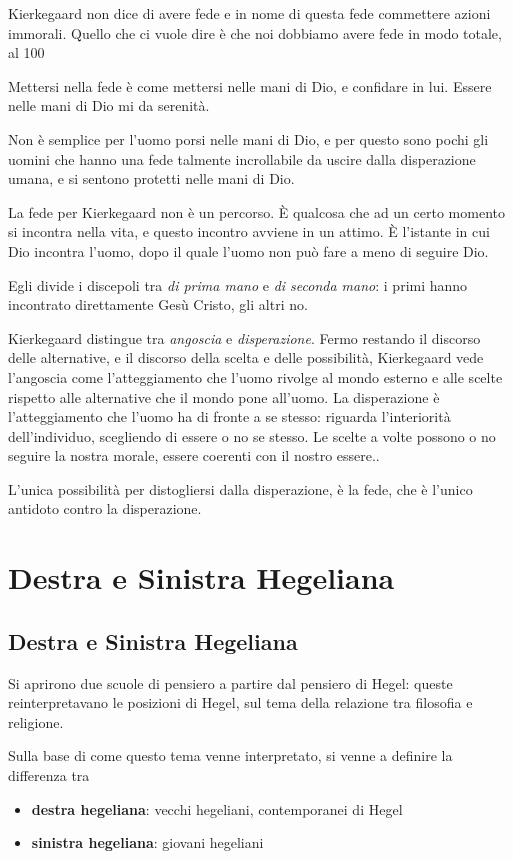 \documentclass[a4paper, twoside, titlepage]{book}
\begin{document}
Kierkegaard non dice di avere fede e in nome di questa fede commettere azioni immorali. Quello che ci vuole dire è che noi dobbiamo avere fede in modo totale, al 100%

Mettersi nella fede è come mettersi nelle mani di Dio, e confidare in lui. Essere nelle mani di Dio mi da serenità.

Non è semplice per l'uomo porsi nelle mani di Dio, e per questo sono pochi gli uomini che hanno una fede talmente incrollabile da uscire dalla disperazione umana, e si sentono protetti nelle mani di Dio.

La fede per Kierkegaard non è un percorso. È qualcosa che ad un certo momento si incontra nella vita, e questo incontro avviene in un attimo. È l'istante in cui Dio incontra l'uomo, dopo il quale l'uomo non può fare a meno di seguire Dio.

Egli divide i discepoli tra \textit{di prima mano} e \textit{di seconda mano}: i primi hanno incontrato direttamente Gesù Cristo, gli altri no.

Kierkegaard distingue tra \textit{angoscia} e \textit{disperazione}. Fermo restando il discorso delle alternative, e il discorso della scelta e delle possibilità, Kierkegaard vede l'angoscia come l'atteggiamento che l'uomo rivolge al mondo esterno e alle scelte rispetto alle alternative che il mondo pone all'uomo. La disperazione è l'atteggiamento che l'uomo ha di fronte a se stesso: riguarda l’interiorità dell’individuo, scegliendo di essere o no se stesso. Le scelte a volte possono o no seguire la nostra morale, essere coerenti con il nostro essere..

L'unica possibilità per distogliersi dalla disperazione, è la fede, che è l'unico antidoto contro la disperazione.


\part{Destra e Sinistra Hegeliana}

\chapter*{Destra e Sinistra Hegeliana}

Si aprirono due scuole di pensiero a partire dal pensiero di Hegel: queste reinterpretavano le posizioni di Hegel, sul tema della relazione tra filosofia e religione.

Sulla base di come questo tema venne interpretato, si venne a definire la differenza tra
\begin{itemize}
\item \textbf{destra hegeliana}: vecchi hegeliani, contemporanei di Hegel
\item \textbf{sinistra hegeliana}: giovani hegeliani
\end{itemize}
\end{document}
